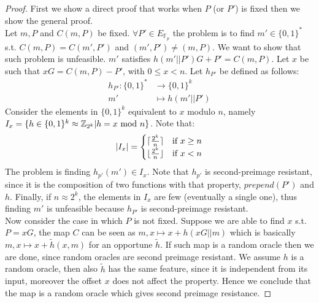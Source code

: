 \begin{proof}
	First we show a direct proof that works when $P$ (or $P'$) is fixed then we show the general proof.
	\\
	Let $m,P$ and $C(m,P)$ be fixed.
	$\forall P' \in E_{\mathbb{F}_p}$ the problem is to find $m' \in \{0,1\}^*$ s.t. $C(m,P)=C(m',P')$ and $(m', P') \neq (m, P)$. 
	We want to show that such problem is unfeasible.
	$m'$ satisfies $h(m'||P')G + P'=C(m,P)$.
	Let $x$ be such that $xG = C(m,P) - P'$, with $0\leq x<n$. 
	Let $h_{P'}$ be defined as follows:
	\begin{equation}
	\begin{split}
	h_{P'}:\{0,1\}^* & \rightarrow \{0,1\}^k\\
	m' & \mapsto h(m'||P')
	\end{split}
	\end{equation}
	Consider the elements in $\{0,1\}^{k}$ equivalent to $x$ modulo $n$, namely $I_x=\{h \in \{0,1\}^k \approx \mathbb{Z}_{2^k} | h=x\textmd{ mod }n\}$.
	Note that:
	\begin{equation}
		|I_x|=\begin{cases}
				\lceil\frac{2^k}{n}\rceil & \textmd{if } x\geq n \\
				\lfloor\frac{2^k}{n}\rfloor & \textmd{if } x< n
		      \end{cases}
	\end{equation}
	The problem is finding $h_{p'}(m')\in I_x$.
	Note that $h_{p'}$ is second-preimage resistant, since it is the composition of two functions with that property, $prepend(P')$ and $h$.
	Finally, if $n \approx 2^k$, the elements in $I_x$ are few (eventually a single one), thus finding $m'$ is unfeasible because $h_{P'}$ is second-preimage resistant.
	\\
	Now consider the case in which $P$ is not fixed.
	Suppose we are able to find $x$ s.t. $P=xG$, the map $C$ can be seen as $m,x \mapsto x + h(xG||m)$ which is basically $m,x \mapsto x + \tilde{h}(x,m)$ for an opportune $\tilde{h}$.
	If such map is a random oracle then we are done, since random oracles are second preimage resistant.
	We assume $h$ is a random oracle, then also $\tilde{h}$ has the same feature, since it is independent from its input, moreover the offset $x$ does not affect the property. 
	Hence we conclude that the map is a random oracle which gives second preimage resistance.
\end{proof}

